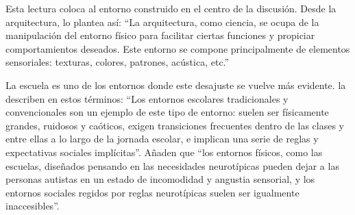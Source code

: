Esta lectura coloca al entorno construido en el centro de la discusión. Desde la arquitectura, \citet[p.~143]{mostafa2014} lo plantea así: \enquote{La arquitectura, como ciencia, se ocupa de la manipulación del entorno físico para facilitar ciertas funciones y propiciar comportamientos deseados. Este entorno se compone principalmente de elementos sensoriales: texturas, colores, patrones, acústica, etc.}

La escuela es uno de los entornos donde este desajuste se vuelve más evidente. \citet{pellicano2022} la describen en estos términos: \enquote{Los entornos escolares tradicionales y convencionales son un ejemplo de este tipo de entorno: suelen ser físicamente grandes, ruidosos y caóticos, exigen transiciones frecuentes dentro de las clases y entre ellas a lo largo de la jornada escolar, e implican una serie de reglas y expectativas sociales implícitas}.
Añaden que \enquote{los entornos físicos, como las escuelas, diseñados pensando en las necesidades neurotípicas pueden dejar a las personas autistas en un estado de incomodidad y angustia sensorial, y los entornos sociales regidos por reglas neurotípicas suelen ser igualmente inaccesibles}.

